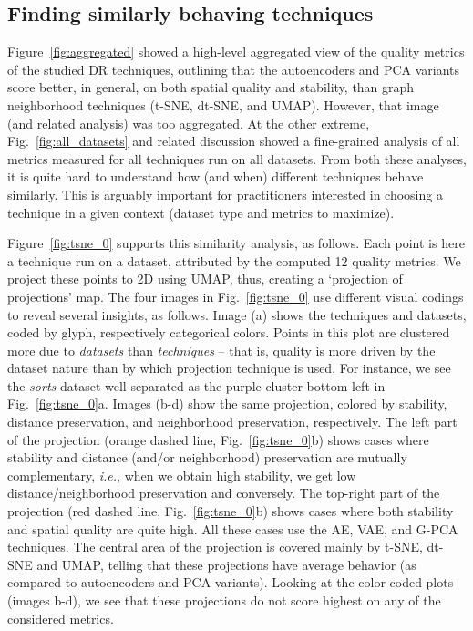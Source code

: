 

\subsection{Finding similarly behaving techniques}
\label{sec:choice}
%
Figure~\ref{fig:aggregated} showed a high-level aggregated view of the quality metrics of the studied DR techniques, outlining that the autoencoders and PCA variants score better, in general, on both spatial quality and stability, than graph neighborhood techniques (t-SNE, dt-SNE, and UMAP). However, that image (and related analysis) was too aggregated. At the other extreme, Fig.~\ref{fig:all_datasets} and related discussion showed a fine-grained analysis of all metrics measured for all techniques run on all datasets. From both these analyses, it is quite hard to understand how (and when) different techniques behave similarly. This is arguably important for practitioners interested in choosing a technique in a given context (dataset type and metrics to maximize).

Figure~\ref{fig:tsne_0} supports this similarity analysis, as follows. Each point is here a technique run on a dataset, attributed by the computed 12 quality metrics. We project these points to 2D using UMAP, thus, creating a `projection of projections' map. The four images in Fig.~\ref{fig:tsne_0} use different visual codings to reveal several insights, as follows. Image (a) shows the techniques and datasets, coded by glyph, respectively categorical colors. Points in this plot are clustered more due to \emph{datasets} than \emph{techniques} -- that is, quality is more driven by the dataset nature than by which projection technique is used. For instance, we see the \emph{sorts} dataset well-separated as the purple cluster bottom-left in Fig.~\ref{fig:tsne_0}a. Images (b-d) show the same projection, colored by stability, distance preservation, and neighborhood preservation, respectively. The left part of the projection (orange dashed line, Fig.~\ref{fig:tsne_0}b) shows cases where stability and distance (and/or neighborhood) preservation are mutually complementary, \emph{i.e.}, when we obtain high stability, we get low distance/neighborhood preservation and conversely. The top-right part of the projection  (red dashed line, Fig.~\ref{fig:tsne_0}b) shows cases where both stability and spatial quality are quite high. All these cases use the AE, VAE, and G-PCA techniques. The central area of the projection is covered mainly by t-SNE, dt-SNE and UMAP, telling that these projections have average behavior (as compared to autoencoders and PCA variants). Looking at the color-coded plots (images b-d), we see that these projections do not score highest on any of the considered metrics.


